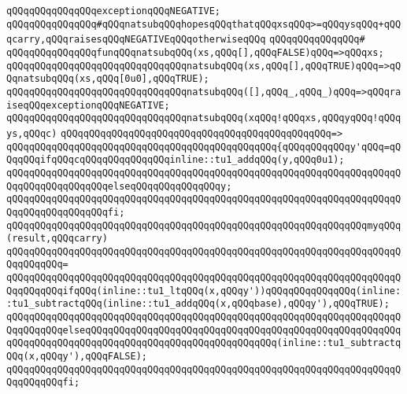 \newline
\verb|qQQqqQQqqQQqqQQqexceptionqQQqNEGATIVE;|\newline
\newline
\verb|qQQqqQQqqQQqqQQq#qQQqnatsubqQQqhopesqQQqthatqQQqxsqQQq>=qQQqysqQQq+qQQqcarry,qQQqraisesqQQqNEGATIVEqQQqotherwiseqQQq|\newline
\verb|qQQqqQQqqQQqqQQq#|\newline
\verb|qQQqqQQqqQQqqQQqfunqQQqnatsubqQQq(xs,qQQq[],qQQqFALSE)qQQq=>qQQqxs;|\newline
\verb|qQQqqQQqqQQqqQQqqQQqqQQqqQQqqQQqnatsubqQQq(xs,qQQq[],qQQqTRUE)qQQq=>qQQqnatsubqQQq(xs,qQQq[0u0],qQQqTRUE);|\newline
\verb|qQQqqQQqqQQqqQQqqQQqqQQqqQQqqQQqnatsubqQQq([],qQQq_,qQQq_)qQQq=>qQQqraiseqQQqexceptionqQQqNEGATIVE;|\newline
\newline
\verb|qQQqqQQqqQQqqQQqqQQqqQQqqQQqqQQqnatsubqQQq(xqQQq!qQQqxs,qQQqyqQQq!qQQqys,qQQqc)|\newline
\verb|qQQqqQQqqQQqqQQqqQQqqQQqqQQqqQQqqQQqqQQqqQQqqQQq=>|\newline
\verb|qQQqqQQqqQQqqQQqqQQqqQQqqQQqqQQqqQQqqQQqqQQqqQQq{qQQqqQQqqQQqy'qQQq=qQQqqQQqifqQQqcqQQqqQQqqQQqqQQqinline::tu1_addqQQq(y,qQQq0u1);|\newline
\verb|qQQqqQQqqQQqqQQqqQQqqQQqqQQqqQQqqQQqqQQqqQQqqQQqqQQqqQQqqQQqqQQqqQQqqQQqqQQqqQQqqQQqqQQqelseqQQqqQQqqQQqqQQqy;|\newline
\verb|qQQqqQQqqQQqqQQqqQQqqQQqqQQqqQQqqQQqqQQqqQQqqQQqqQQqqQQqqQQqqQQqqQQqqQQqqQQqqQQqqQQqqQQqfi;|\newline
\newline
\verb|qQQqqQQqqQQqqQQqqQQqqQQqqQQqqQQqqQQqqQQqqQQqqQQqqQQqqQQqqQQqqQQqmyqQQq(result,qQQqcarry)|\newline
\verb|qQQqqQQqqQQqqQQqqQQqqQQqqQQqqQQqqQQqqQQqqQQqqQQqqQQqqQQqqQQqqQQqqQQqqQQqqQQqqQQq=|\newline
\verb|qQQqqQQqqQQqqQQqqQQqqQQqqQQqqQQqqQQqqQQqqQQqqQQqqQQqqQQqqQQqqQQqqQQqqQQqqQQqqQQqifqQQq(inline::tu1_ltqQQq(x,qQQqy'))qQQqqQQqqQQqqQQq(inline::tu1_subtractqQQq(inline::tu1_addqQQq(x,qQQqbase),qQQqy'),qQQqTRUE);|\newline
\verb|qQQqqQQqqQQqqQQqqQQqqQQqqQQqqQQqqQQqqQQqqQQqqQQqqQQqqQQqqQQqqQQqqQQqqQQqqQQqqQQqelseqQQqqQQqqQQqqQQqqQQqqQQqqQQqqQQqqQQqqQQqqQQqqQQqqQQqqQQqqQQqqQQqqQQqqQQqqQQqqQQqqQQqqQQqqQQqqQQqqQQqqQQq(inline::tu1_subtractqQQq(x,qQQqy'),qQQqFALSE);|\newline
\verb|qQQqqQQqqQQqqQQqqQQqqQQqqQQqqQQqqQQqqQQqqQQqqQQqqQQqqQQqqQQqqQQqqQQqqQQqqQQqqQQqfi;|\newline
